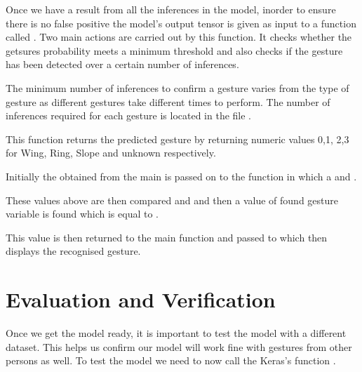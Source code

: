Once we have a result from all the inferences in the model, inorder to ensure there is no false positive the model's output tensor is given as input to a function called .
Two main actions are carried out by this function. It checks whether the getsures probability meets a minimum threshold and also checks if the gesture has been detected over a certain number of inferences. 

The minimum number of inferences to confirm a gesture varies from the type of gesture as different gestures take different times to perform. The number of inferences required for each gesture is located in the file . \cite{Warden:2020}

This function returns the predicted gesture by returning numeric values 0,1, 2,3 for Wing, Ring, Slope and unknown respectively.

Initially the  obtained from the main is passed on to the function in which a  and .

These values  above are then compared  and  and then a value of found gesture variable is found which is equal to .

This value is then returned to the main function and passed to  which then displays the recognised gesture. \cite{Warden:2020}





%
% 

\section{Evaluation and Verification}

Once we get the model ready, it is important to test the model with a different dataset. This helps us confirm our model will work fine with gestures from other persons as well. To test the model we need to now call the Keras's function  . \cite{Warden:2020}



